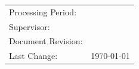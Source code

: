 \begin{titlepage}
\begin{center}
	\setlength{\tabcolsep}{24pt}	%
	\begin{tabular}{ll}
		Processing Period:&  \myperiod\\
		Supervisor:&\mytutor\\
		Document Revision:& \myrev\\
		Last Change:& \today\\
	\end{tabular}
	\setlength{\tabcolsep}{6pt}		%
	\restoregeometry
\end{center}
\end{titlepage}
\clearpage

